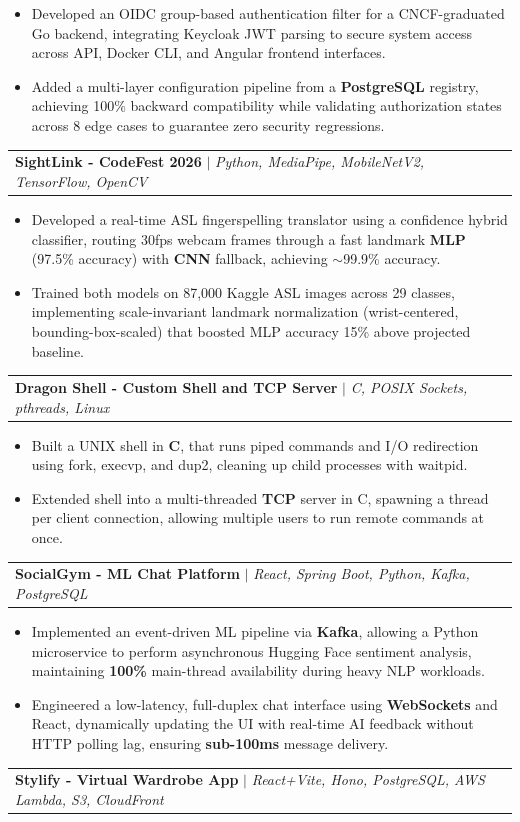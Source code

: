 \documentclass[letterpaper,11pt]{article}
\makeatletter
\newcommand{\resumeItem}[1]{
  \item\small{
    {#1 \vspace{-2pt}}
  }
}
\newcommand{\resumeProjectHeading}[2]{
    \item
    \begin{tabular*}{0.97\textwidth}{l@{\extracolsep{\fill}}r}
      \small#1 & #2 \\
    \end{tabular*}\vspace{-7pt}
}
\newcommand{\resumeItemListStart}{\begin{itemize}}
\newcommand{\resumeItemListEnd}{\end{itemize}\vspace{-5pt}}
\makeatother
\begin{document}
      \resumeItemListStart
        \resumeItem{Developed an OIDC group-based authentication filter for a CNCF-graduated Go backend, integrating Keycloak JWT parsing to secure system access across API, Docker CLI, and Angular frontend interfaces.}
        \resumeItem{Added a multi-layer configuration pipeline from a \textbf{PostgreSQL} registry, achieving 100\% backward compatibility while validating authorization states across 8 edge cases to guarantee zero security regressions.}
      \resumeItemListEnd
        \resumeProjectHeading
          {\textbf{SightLink - CodeFest 2026} $|$ \emph{Python, MediaPipe, MobileNetV2, TensorFlow, OpenCV}}{}
          \resumeItemListStart
            \resumeItem{Developed a real-time ASL fingerspelling translator using a confidence hybrid classifier, routing 30fps webcam frames through a fast landmark \textbf{MLP} (97.5\% accuracy) with \textbf{CNN} fallback, achieving $\sim$99.9\% accuracy.}
            \resumeItem{Trained both models on 87,000 Kaggle ASL images across 29 classes, implementing scale-invariant landmark normalization (wrist-centered, bounding-box-scaled) that boosted MLP accuracy 15\% above projected baseline.}
          \resumeItemListEnd
          \resumeProjectHeading
          {\textbf{Dragon Shell - Custom Shell and TCP Server} $|$ \emph{C, POSIX Sockets, pthreads, Linux}}{}
          \resumeItemListStart
            \resumeItem{Built a UNIX shell in \textbf{C}, that runs piped commands and I/O redirection using fork, execvp, and dup2, cleaning up child processes with waitpid.}
            \resumeItem{Extended shell into a multi-threaded \textbf{TCP} server in C, spawning a thread per client connection, allowing multiple users to run remote commands at once.}
          \resumeItemListEnd
        \resumeProjectHeading
          {\textbf{SocialGym - ML Chat Platform} $|$ \emph{React, Spring Boot, Python, Kafka, PostgreSQL}}{}
          \resumeItemListStart
            \resumeItem{Implemented an event-driven ML pipeline via \textbf{Kafka}, allowing a Python microservice to perform asynchronous Hugging Face sentiment analysis, maintaining \textbf{100\%} main-thread availability during heavy NLP workloads.}
            \resumeItem{Engineered a low-latency, full-duplex chat interface using \textbf{WebSockets} and React, dynamically updating the UI with real-time AI feedback without HTTP polling lag, ensuring \textbf{sub-100ms} message delivery.}
          \resumeItemListEnd
      \resumeProjectHeading
          {\textbf{Stylify - Virtual Wardrobe App} $|$ \emph{React+Vite, Hono, PostgreSQL, AWS Lambda, S3, CloudFront}}{}
\end{document}
